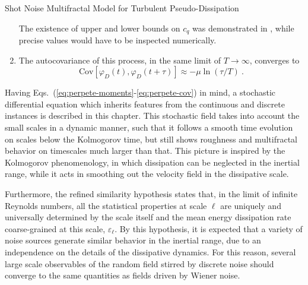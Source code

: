 \begin{chapter}{Shot Noise Multifractal Model for Turbulent Pseudo-Dissipation}
\begin{enumerate}[label=(\roman*)]
    The existence of upper and lower bounds on $c_q$ was demonstrated in \textcite{perpete2011}, while precise values would have to be inspected numerically.
    \item The autocovariance of this process, in the same limit of $T \to \infty$,
    converges to
    \begin{equation} \label{eq:perpete-cov}
    \mathrm{Cov}[\varphi_D(t), \varphi_D(t+\tau)] \approx
    - \mu \ln(\tau/T) \ \mbox{.}
    \end{equation}
\end{enumerate}

Having Eqs.~(\ref{eq:perpete-moments}-\ref{eq:perpete-cov}) in mind, a stochastic differential equation which inherits features from the continuous and discrete instances is described in this chapter. This stochastic field takes into account the small scales in a dynamic manner, such that it follows a smooth time evolution on scales below the Kolmogorov time, but still shows roughness and multifractal behavior on timescales much larger than that. This picture is inspired by the Kolmogorov phenomenology, in which dissipation can be neglected in the inertial range, while it acts in smoothing out the velocity field in the dissipative scale.

Furthermore, the refined similarity hypothesis states that, in the limit of infinite Reynolds numbers, all the statistical properties at scale $\ell$ are uniquely and universally determined by the scale itself and the mean energy dissipation rate coarse-grained at this scale, $\varepsilon_{\ell}$.
By this hypothesis, it is expected that a variety of noise sources generate similar behavior in the inertial range, due to an independence on the details of the dissipative dynamics.
For this reason, several large scale observables of the random field stirred by discrete noise should converge to the same quantities as fields driven by Wiener noise.



\end{chapter}
